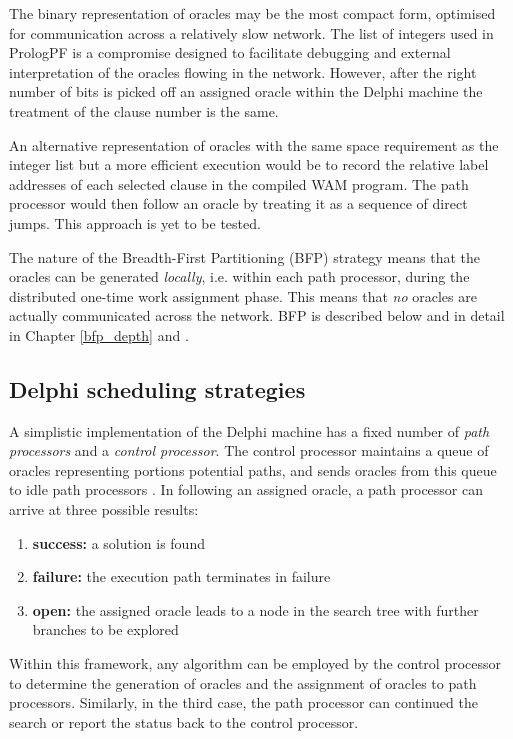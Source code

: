 The binary representation of oracles may be the most compact form, optimised 
for communication across
a relatively slow network.  The list of integers used in PrologPF is a compromise
designed to facilitate debugging and external interpretation of the oracles flowing
in the network.  However, after the right number of bits is picked off an assigned 
oracle within the Delphi machine the treatment of the clause number is the same.

An alternative representation of oracles with the same space requirement as the
integer list but a more efficient execution would be to record the
relative label addresses of
each selected clause in the compiled WAM program.  The path processor would then follow
an oracle by treating it as a sequence of direct jumps.  This approach is yet to be
tested.

The nature of the Breadth-First Partitioning (BFP) strategy means that the oracles can
be generated \textit{locally}, i.e. within each path processor,
during the distributed one-time work assignment phase.  This means that
\textit{no} oracles are actually communicated across the network.  BFP is described
below and in detail in Chapter \ref{bfp_depth} and \cite{Sar95}.

\subsection{Delphi scheduling strategies}

A simplistic implementation of the Delphi machine has a fixed number of
\textit{path processors} and a \textit{control processor}.  The control processor
maintains a queue of oracles representing portions potential paths, and sends
oracles from this queue to idle path processors \cite{AM88}.  In following an
assigned oracle, a path processor can arrive at three possible results:
\begin{enumerate}
\item{\textbf{success:} a solution is found}
\item{\textbf{failure:} the execution path terminates in failure}
\item{\textbf{open:} the assigned oracle leads to a node in the search tree with further
  branches to be explored}
\end{enumerate}

Within this framework, any algorithm can be employed by the control processor to
determine the generation of oracles
and the assignment of oracles to path processors.  Similarly,
in the third case, the path processor can
continued the search or report the status back to the control processor.

